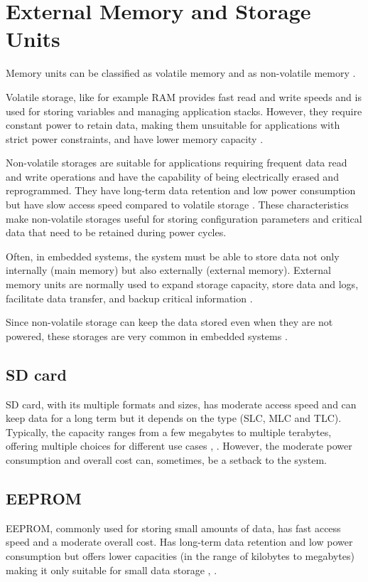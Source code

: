 \section{External Memory and Storage Units}

Memory units can be classified as volatile memory and as non-volatile memory \cite{mem3}.

Volatile storage, like for example \gls{RAM} provides fast read and write speeds and is used for storing variables and managing application stacks.
However, they require constant power to retain data, making them unsuitable for applications with strict power constraints, and have lower memory capacity \cite{mem8}.

Non-volatile storages are suitable for applications requiring frequent data read and write operations and have the capability of being electrically erased and reprogrammed.
They have long-term data retention and low power consumption but have slow access speed compared to volatile storage \cite{mem8}.
These characteristics make non-volatile storages useful for storing configuration parameters and critical data that need to be retained during power cycles.

Often, in embedded systems, the system must be able to store data not only internally (main memory) but also externally (external memory).
External memory units are normally used to expand storage capacity, store data and logs, facilitate data transfer, and backup critical information \cite{mem3}.

Since non-volatile storage can keep the data stored even when they are not powered, these storages are very common in embedded systems \cite{mem1}.

\subsection{\gls{SD} card}
\gls{SD} card, with its multiple formats and sizes, has moderate access speed and can keep data for a long term but it depends on the type (\gls{SLC}, \gls{MLC} and \gls{TLC}).
Typically, the capacity ranges from a few megabytes to multiple terabytes, offering multiple choices for different use cases \cite{mem11}, \cite{mem9}.
However, the moderate power consumption and overall cost can, sometimes, be a setback to the system.

\subsection{\gls{EEPROM}}
\gls{EEPROM}, commonly used for storing small amounts of data, has fast access speed and a moderate overall cost.
Has long-term data retention and low power consumption but offers lower capacities (in the range of kilobytes to megabytes) making it only suitable for small data storage \cite{mem8}, \cite{mem11}.

